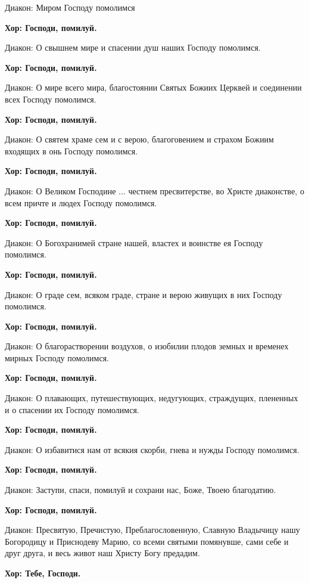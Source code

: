 \documentclass[12pt,a4paper,titlepage]{report}
\begin{document}
\begin{paracol}[1]{2}
  Диакон: Миром Господу помолимся

  \textbf{Хор: Господи, помилуй.}

  Диакон: О свышнем мире и спасении душ наших Господу помолимся.

  \textbf{Хор: Господи, помилуй.}

  Диакон: О мире всего мира, благостоянии Святых Божиих Церквей и соединении всех Господу помолимся.

  \textbf{Хор: Господи, помилуй.}

  Диакон: О святем храме сем и с верою, благоговением и страхом Божиим входящих в онь Господу помолимся.

  \textbf{Хор: Господи, помилуй.}

  Диакон: О Великом Господине ... честнем пресвитерстве, во Христе диаконстве, о всем причте и людех Господу помолимся.

  \textbf{Хор: Господи, помилуй.}

  Диакон: О Богохранимей стране нашей, властех и воинстве ея Господу помолимся.

  \textbf{Хор: Господи, помилуй.}

  Диакон: О граде сем, всяком граде, стране и верою живущих в них Господу помолимся.

  \textbf{Хор: Господи, помилуй.}

  Диакон: О благорастворении воздухов, о изобилии плодов земных и временех мирных Господу помолимся.

  \textbf{Хор: Господи, помилуй.}

  Диакон: О плавающих, путешествующих, недугующих, страждущих, плененных и о спасении их Господу помолимся.

  \textbf{Хор: Господи, помилуй.}

  Диакон: О избавитися нам от всякия скорби, гнева и нужды Господу помолимся.

  \textbf{Хор: Господи, помилуй.}

  Диакон: Заступи, спаси, помилуй и сохрани нас, Боже, Твоею благодатию.

  \textbf{Хор: Господи, помилуй.}

  Диакон: Пресвятую, Пречистую, Преблагословенную, Славную Владычицу нашу Богородицу и Приснодеву Марию, со всеми святыми помянувше, сами себе и друг друга, и весь живот наш Христу Богу предадим.

  \textbf{Хор: Тебе, Господи.}


\end{paracol}
\end{document}
